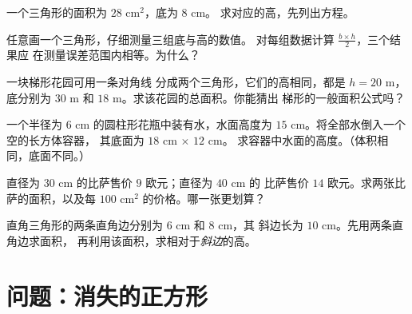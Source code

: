 \begin{exercise}[$\star$]\label{exo:g7:areas:7}
一个三角形的面积为 $28$ cm$^2$，底为 $8$ cm。
求对应的高，先列出方程。
\end{exercise}

\begin{exercise}[$\star\star$]\label{exo:g7:areas:8}
任意画一个三角形，仔细测量三组底与高的数值。
对每组数据计算 $\frac{b \times h}{2}$，三个结果应
在测量误差范围内相等。为什么？
\end{exercise}

\begin{exercise}[$\star\star$]\label{exo:g7:areas:9}
一块梯形花园可用一条对角线
分成两个三角形，它们的高相同，都是 $h = 20$ m，底分别为 $30$ m 和
$18$ m。求该花园的总面积。你能猜出
梯形的一般面积公式吗？
\end{exercise}

\begin{exercise}[$\star\star$]\label{exo:g7:areas:10}
一个半径为 $6$ cm 的圆柱形花瓶中装有水，水面高度为
$15$ cm。将全部水倒入一个空的长方体容器，
其底面为 $18$ cm $\times$ $12$ cm。
求容器中水面的高度。（体积相同，底面不同。）
\end{exercise}

\begin{exercise}[$\star\star$]\label{exo:g7:areas:11}
直径为 $30$ cm 的比萨售价 $9$ 欧元；直径为 $40$ cm 的
比萨售价 $14$ 欧元。求两张比萨的面积，以及每 $100$
cm$^2$ 的价格。哪一张更划算？
\end{exercise}

\begin{exercise}[$\star\star\star$]\label{exo:g7:areas:12}
直角三角形的两条直角边分别为 $6$ cm 和 $8$ cm，其
斜边长为 $10$ cm。先用两条直角边求面积，
再利用该面积，求相对于\emph{斜边}的高。
\end{exercise}

\section{问题：消失的正方形}

